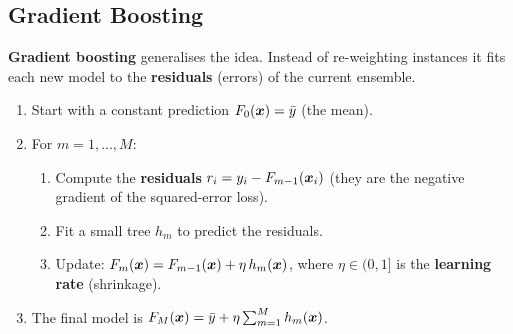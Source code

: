 \subsection{Gradient Boosting}

\textbf{Gradient boosting} generalises the idea. Instead of re-weighting instances it fits each new model to the \textbf{residuals} (errors) of the current ensemble.

\begin{definition}
\begin{enumerate}
  \item Start with a constant prediction $F_0(\boldsymbol{x})=\bar y$ (the mean).
  \item For $m=1,\dots,M$:
  \begin{enumerate}[label=(\alph*)]
    \item Compute the \textbf{residuals} $r_i=y_i-F_{m-1}(\boldsymbol{x}_i)$ (they are the negative gradient of the squared-error loss).
    \item Fit a small tree $h_m$ to predict the residuals.
    \item Update: $F_m(\boldsymbol{x})=F_{m-1}(\boldsymbol{x})+\eta\,h_m(\boldsymbol{x})$, where $\eta\in(0,1]$ is the \textbf{learning rate} (shrinkage).
  \end{enumerate}
  \item The final model is $F_M(\boldsymbol{x})=\bar y+\eta\sum_{m=1}^{M}h_m(\boldsymbol{x})$.
\end{enumerate}
\end{definition}

